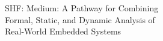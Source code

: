 \documentclass[11pt]{article}
\begin{document}
\begin{center}
  \huge SHF: Medium: A Pathway for Combining\\Formal, Static, and
  Dynamic Analysis of\\Real-World Embedded Systems
\end{center}













\newpage
\setcounter{page}{1}



\end{document}
